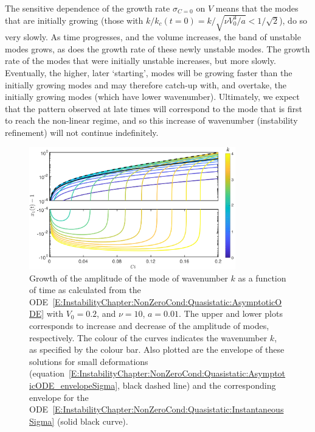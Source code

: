 The sensitive dependence of the growth rate $ \sigma_{C=0}$ on $V$ means that the modes that are initially growing (those with $k/k_c(t= 0) = k/\sqrt{\nu V_0^3 / a} < 1/\sqrt{2}$), do so very slowly. As time progresses, and the volume increases, the band of unstable modes grows, as does the growth rate of these newly unstable modes. The growth rate of the modes that were initially unstable increases, but more slowly. Eventually, the higher, later `starting', modes will be growing faster than the initially growing modes and may therefore catch-up with, and overtake, the initially growing modes (which have lower wavenumber). Ultimately, we expect that the pattern observed at late times will correspond to the mode that is first to reach the non-linear regime, and so this increase of wavenumber (instability refinement) will not continue indefinitely.

\begin{figure}[t]
\centering
\includegraphics[width = 0.8\textwidth]{overtake_with_asymptotics_and_bvp}
\caption{Growth of the amplitude of the mode of wavenumber $k$ as a function of time as calculated from the ODE~\eqref{E:InstabilityChapter:NonZeroCond:Quasistatic:AsymptoticODE}  with $V_0 = 0.2$, and $\nu = 10$, $a = 0.01$. The upper and lower plots corresponds to increase and decrease of the amplitude of modes, respectively. The colour of the curves indicates the wavenumber $k$, as specified by the colour bar. Also plotted are the envelope of these solutions for small deformations (equation~\eqref{E:InstabilityChapter:NonZeroCond:Quasistatic:AsymptoticODE_envelopeSigma}, black dashed line) and the corresponding envelope for the ODE~\eqref{E:InstabilityChapter:NonZeroCond:Quasistatic:InstantaneousSigma} (solid black curve).}
\label{fig:InstabilityChapter:NonZeroCond:QuasistaticOvertake}
\end{figure}


